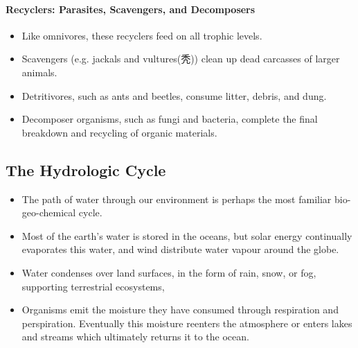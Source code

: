\documentclass[10pt]{article}
\begin{document}
\paragraph{Recyclers: Parasites, Scavengers, and Decomposers}
\begin{itemize}
    \item Like omnivores, these recyclers feed on all trophic levels. 
    \item Scavengers (e.g. jackals and vultures(秃)) clean up dead carcasses of larger animals. 
    \item Detritivores, such as ants and beetles, consume litter, debris, and dung. 
    \item Decomposer organisms, such as fungi and bacteria, complete the final breakdown and recycling of organic materials. 
\end{itemize}

\subsection{The Hydrologic Cycle}
\begin{itemize}
    \item The path of water through our environment is perhaps the most familiar bio-geo-chemical cycle. 
    \item Most of the earth's water is stored in the oceans, but solar energy continually evaporates this water, and wind distribute water vapour around the globe. 
    \item Water condenses over land surfaces, in the form of rain, snow, or fog, supporting terrestrial ecosystems, 
    \item Organisms emit the moisture they have consumed through respiration and perspiration. Eventually this moisture reenters the atmosphere or enters lakes and streams which ultimately returns it to the ocean. 
\end{itemize}
\end{document}
